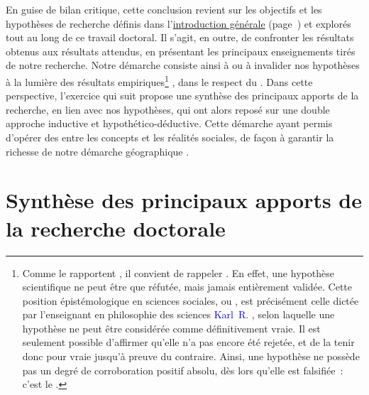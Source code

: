 \begin{refsegment}
En guise de bilan critique, cette conclusion revient sur les objectifs et les hypothèses de recherche définis dans l’\hyperref[body:introduction-generale]{introduction générale} (page~\pageref{body:introduction-generale}) et explorés tout au long de ce travail doctoral. Il s’agit, en outre, de confronter les résultats obtenus aux résultats attendus, en présentant les principaux enseignements tirés de notre recherche. Notre démarche consiste ainsi à  ou à invalider nos hypothèses à la lumière des résultats empiriques\footnote{
    Comme le rapportent \textcolor{blue}{\textcite[44]{tomini_methodes_2020}}, il convient de rappeler . En effet, une hypothèse scientifique ne peut être que réfutée, mais jamais entièrement validée. Cette position épistémologique en sciences sociales, ou  \textcolor{blue}{\autocite[303]{baraquin_popper_2020}}, est précisément celle dictée par l'enseignant en philosophie des sciences \textcolor{blue}{Karl~R.} \textcolor{blue}{\textcite[273]{popper_logique_1973}}, selon laquelle une hypothèse ne peut être considérée comme définitivement vraie. Il est seulement possible d'affirmer qu'elle n'a pas encore été rejetée, et de la tenir donc pour vraie jusqu'à preuve du contraire. Ainsi, une hypothèse ne possède pas un degré de corroboration positif absolu, dès lors qu'elle est falsifiée~: c'est le .
} \textcolor{blue}{\autocite[44]{tomini_methodes_2020}}, dans le respect du  \textcolor{blue}{\autocite[273]{popper_logique_1973}}. Dans cette perspective, l'exercice qui suit propose une synthèse des principaux apports de la recherche, en lien avec nos hypothèses, qui ont alors reposé sur une double approche inductive et hypothético-déductive. Cette démarche ayant permis d'opérer des  entre les concepts et les réalités sociales, de façon à garantir la richesse de notre démarche géographique \textcolor{blue}{\autocite[24]{ageron_intermodalite-voyageurs_2013}}.%

    \newpage
\section*{Synthèse des principaux apports de la recherche doctorale
    \label{conclusion-generale:principaux-apports}
    }


\end{refsegment}
